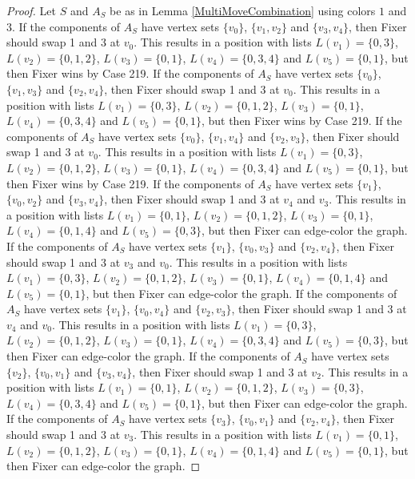 \documentclass[12pt]{amsart}
\theoremstyle{plain}
\theoremstyle{definition}
\theoremstyle{remark}
\begin{document}
\begin{proof}
Let $S$ and $A_S$ be as in Lemma \ref{MultiMoveCombination} using colors $1$ and $3$. If the components of $A_S$ have vertex sets $\{v_0\}$, $\{v_1, v_2\}$ and $\{v_3, v_4\}$, then Fixer should swap 1 and 3 at $v_0$. This results in a position with lists $L(v_1) = \{0, 3\}$, $L(v_2) = \{0, 1, 2\}$, $L(v_3) = \{0, 1\}$, $L(v_4) = \{0, 3, 4\}$ and $L(v_5) = \{0, 1\}$, but then Fixer wins by Case 219.
If the components of $A_S$ have vertex sets $\{v_0\}$, $\{v_1, v_3\}$ and $\{v_2, v_4\}$, then Fixer should swap 1 and 3 at $v_0$. This results in a position with lists $L(v_1) = \{0, 3\}$, $L(v_2) = \{0, 1, 2\}$, $L(v_3) = \{0, 1\}$, $L(v_4) = \{0, 3, 4\}$ and $L(v_5) = \{0, 1\}$, but then Fixer wins by Case 219.
If the components of $A_S$ have vertex sets $\{v_0\}$, $\{v_1, v_4\}$ and $\{v_2, v_3\}$, then Fixer should swap 1 and 3 at $v_0$. This results in a position with lists $L(v_1) = \{0, 3\}$, $L(v_2) = \{0, 1, 2\}$, $L(v_3) = \{0, 1\}$, $L(v_4) = \{0, 3, 4\}$ and $L(v_5) = \{0, 1\}$, but then Fixer wins by Case 219.
If the components of $A_S$ have vertex sets $\{v_1\}$, $\{v_0, v_2\}$ and $\{v_3, v_4\}$, then Fixer should swap 1 and 3 at $v_4$ and $v_3$. This results in a position with lists $L(v_1) = \{0, 1\}$, $L(v_2) = \{0, 1, 2\}$, $L(v_3) = \{0, 1\}$, $L(v_4) = \{0, 1, 4\}$ and $L(v_5) = \{0, 3\}$, but then Fixer can edge-color the graph.
If the components of $A_S$ have vertex sets $\{v_1\}$, $\{v_0, v_3\}$ and $\{v_2, v_4\}$, then Fixer should swap 1 and 3 at $v_3$ and $v_0$. This results in a position with lists $L(v_1) = \{0, 3\}$, $L(v_2) = \{0, 1, 2\}$, $L(v_3) = \{0, 1\}$, $L(v_4) = \{0, 1, 4\}$ and $L(v_5) = \{0, 1\}$, but then Fixer can edge-color the graph.
If the components of $A_S$ have vertex sets $\{v_1\}$, $\{v_0, v_4\}$ and $\{v_2, v_3\}$, then Fixer should swap 1 and 3 at $v_4$ and $v_0$. This results in a position with lists $L(v_1) = \{0, 3\}$, $L(v_2) = \{0, 1, 2\}$, $L(v_3) = \{0, 1\}$, $L(v_4) = \{0, 3, 4\}$ and $L(v_5) = \{0, 3\}$, but then Fixer can edge-color the graph.
If the components of $A_S$ have vertex sets $\{v_2\}$, $\{v_0, v_1\}$ and $\{v_3, v_4\}$, then Fixer should swap 1 and 3 at $v_2$. This results in a position with lists $L(v_1) = \{0, 1\}$, $L(v_2) = \{0, 1, 2\}$, $L(v_3) = \{0, 3\}$, $L(v_4) = \{0, 3, 4\}$ and $L(v_5) = \{0, 1\}$, but then Fixer can edge-color the graph.
If the components of $A_S$ have vertex sets $\{v_3\}$, $\{v_0, v_1\}$ and $\{v_2, v_4\}$, then Fixer should swap 1 and 3 at $v_3$. This results in a position with lists $L(v_1) = \{0, 1\}$, $L(v_2) = \{0, 1, 2\}$, $L(v_3) = \{0, 1\}$, $L(v_4) = \{0, 1, 4\}$ and $L(v_5) = \{0, 1\}$, but then Fixer can edge-color the graph.

\end{proof}
\end{document}
